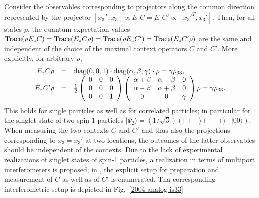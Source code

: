 \documentclass[prl,showpacs,showkeys,amsfonts]{revtex4}
\begin{document}
Consider the observables corresponding to projectors along the common direction
represented by the projector
$[{x_3}^T, {x_3}]\propto E_zC=E_zC' \propto [{x_3'}^T, {x_3'}]$.
Then, for all states $\rho$, the quantum expectation values
$
{\rm Trace} (\rho E_zC) =
{\rm Trace} (E_zC\rho )=
{\rm Trace} (\rho E_zC')=
{\rm Trace} (E_zC'\rho )
$
are the same and independent of the choice of the maximal context operators
$C$ and $C'$.
More explicitly, for arbitrary $\rho$,
\begin{equation}
\begin{array}{rcl}
E_zC\rho &=&
{\rm diag}(0 , 0 , 1 )
\cdot
{\rm diag}(\alpha , \beta , \gamma )
\cdot
\rho
= \gamma \rho_{33},
\\
E_zC'\rho &=&
\frac{1}{2}
\left(
  \begin{array}{ccc}
      0&0 &0 \\
    0&0&0\\
0&0&1
    \end{array}
\right)
\left(
  \begin{array}{ccc}
    \alpha +\beta & \alpha -\beta &0 \\
    \alpha -\beta &\alpha +\beta  &0\\
0&0&\gamma
    \end{array}
\right) \rho = \gamma \rho_{33}.
    \end{array}
\label{2004-qnc-eq1}
\end{equation}
This holds for single particles as well as for correlated particles;
in particular for the singlet state
of two spin-1 particles \cite{mermin80,peres-92}
$
\vert \Psi_2 \rangle
= ({1/ \sqrt{3}})(
\vert + -\rangle
+
\vert - +\rangle
-
\vert 0 0\rangle
)$.
When measuring the two contexts $C$ and $C'$ and thus also
the projections corresponding to $x_3=x_3'$ at two locations,
the outcomes of the latter observables should be independent of the contexts.
Due to the lack of experimental realizations of singlet states of spin-1 particles,
a realization in terms of multiport interferometers \cite{rzbb,zukowski-97} is proposed;
in \cite{svozil-2004-analog}, the explicit setup for preparation and measurement
of $C$ as well as of $C'$ is enumerated. Tha corresponding interferometric setup is depicted in
Fig.~\ref{2004-analog-is33}
\end{document}
